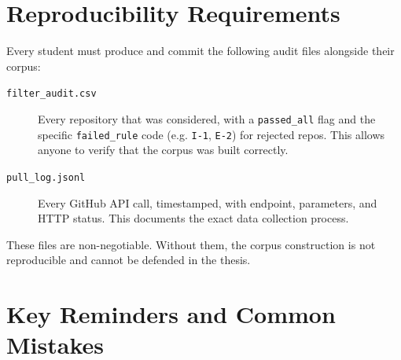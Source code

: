 \documentclass[11pt,a4paper]{article}
\begin{document}
\section{Reproducibility Requirements}

Every student must produce and commit the following audit files alongside their corpus:

\begin{description}
    \item[\texttt{filter\_audit.csv}] Every repository that was considered, with a \texttt{passed\_all} flag and the specific \texttt{failed\_rule} code (e.g. \texttt{I-1}, \texttt{E-2}) for rejected repos. This allows anyone to verify that the corpus was built correctly.
    \item[\texttt{pull\_log.jsonl}] Every GitHub API call, timestamped, with endpoint, parameters, and HTTP status. This documents the exact data collection process.
\end{description}

These files are non-negotiable. Without them, the corpus construction is not reproducible and cannot be defended in the thesis.

\section{Key Reminders and Common Mistakes}
\end{document}
